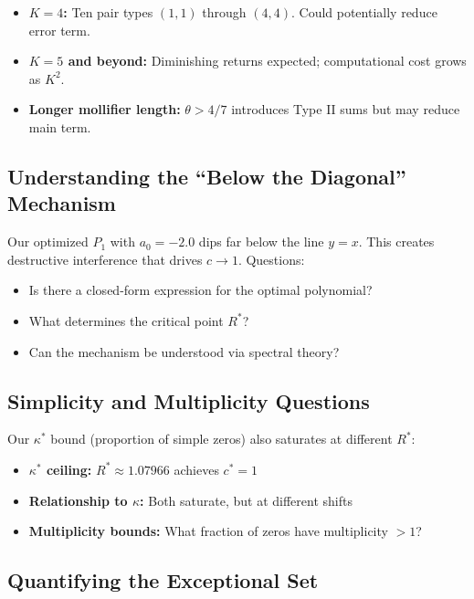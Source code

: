 \documentclass[11pt]{article}
\begin{document}
\begin{itemize}
\item \textbf{$K = 4$:} Ten pair types $(1,1)$ through $(4,4)$. Could potentially reduce error term.
\item \textbf{$K = 5$ and beyond:} Diminishing returns expected; computational cost grows as $K^2$.
\item \textbf{Longer mollifier length:} $\theta > 4/7$ introduces Type II sums but may reduce main term.
\end{itemize}

\subsection{Understanding the ``Below the Diagonal'' Mechanism}

Our optimized $P_1$ with $a_0 = -2.0$ dips far below the line $y = x$. This creates destructive interference that drives $c \to 1$. Questions:

\begin{itemize}
\item Is there a closed-form expression for the optimal polynomial?
\item What determines the critical point $R^*$?
\item Can the mechanism be understood via spectral theory?
\end{itemize}

\subsection{Simplicity and Multiplicity Questions}

Our $\kappa^*$ bound (proportion of simple zeros) also saturates at different $R^*$:

\begin{itemize}
\item \textbf{$\kappa^*$ ceiling:} $R^* \approx 1.07966$ achieves $c^* = 1$
\item \textbf{Relationship to $\kappa$:} Both saturate, but at different shifts
\item \textbf{Multiplicity bounds:} What fraction of zeros have multiplicity $> 1$?
\end{itemize}

\subsection{Quantifying the Exceptional Set}
\end{document}
